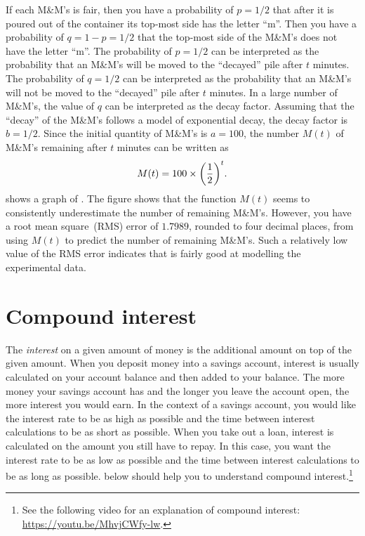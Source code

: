 \documentclass[a4paper,oneside,12pt]{article}
\begin{document}
{\begin{solution}
If each M\&M's is fair, then you have a probability of $p = 1 / 2$
that after it is poured out of the container its top-most side has the
letter ``m''.  Then you have a probability of $q = 1 - p = 1 / 2$ that
the top-most side of the M\&M's does not have the letter ``m''.  The
probability of $p = 1 / 2$ can be interpreted as the probability that
an M\&M's will be moved to the ``decayed'' pile after $t$ minutes.
The probability of $q = 1 / 2$ can be interpreted as the probability
that an M\&M's will not be moved to the ``decayed'' pile after $t$
minutes.  In a large number of M\&M's, the value of $q$ can be
interpreted as the decay factor.  Assuming that the ``decay'' of the
M\&M's follows a model of exponential decay, the decay factor is
$b = 1 / 2$.  Since the initial quantity of M\&M's is $a = 100$, the
number $M(t)$ of M\&M's remaining after $t$ minutes can be written as
\begin{equation}
\label{eqn:MnM_probability_model}
M(t)
=
100
\times
\parenthesis*{
  \frac{1}{2}
}^t.
\end{equation}
 shows a graph of
.  The figure shows that the
function $M(t)$ seems to consistently underestimate the number of
remaining M\&M's.  However, you have a root mean square~(RMS) error of
$1.7989$, rounded to four decimal places, from using $M(t)$ to predict
the number of remaining M\&M's.  Such a relatively low value of the
RMS error indicates that  is
fairly good at modelling the experimental data.
\end{solution}
}{}



\section{Compound interest}

The \emph{interest} on a given amount of money is the additional
amount on top of the given amount.  When you deposit money into a
savings account, interest is usually calculated on your account
balance and then added to your balance.  The more money your savings
account has and the longer you leave the account open, the more
interest you would earn.  In the context of a savings account, you
would like the interest rate to be as high as possible and the time
between interest calculations to be as short as possible.  When you
take out a loan, interest is calculated on the amount you still have
to repay.  In this case, you want the interest rate to be as low as
possible and the time between interest calculations to be as long as
possible.   below should help you to
understand compound interest.\footnote{
  See the following video for an explanation of compound interest:
  \url{https://youtu.be/MhvjCWfy-lw}.
}
\end{document}
